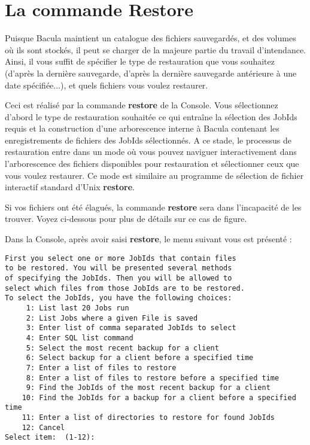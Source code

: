 \label{Example1}
\section{La commande Restore}
Puisque Bacula maintient un catalogue des fichiers sauvegard\'es, et des volumes 
o\`u ils sont stock\'es, il peut se charger de la majeure partie du travail 
d'intendance. Ainsi, il vous suffit de sp\'ecifier le type de restauration que 
vous souhaitez (d'apr\`es la derni\`ere sauvegarde, d'apr\`es la derni\`ere sauvegarde 
ant\'erieure \`a une date sp\'ecifi\'ee...), et quels fichiers vous voulez restaurer. 

Ceci est r\'ealis\'e par la commande {\bf restore} de la Console. Vous s\'electionnez 
d'abord le type de restauration souhait\'ee ce qui entra\^ine la s\'election des 
JobIds requis et la construction d'une arborescence interne \`a Bacula contenant 
les enregistrements de fichiers des JobIds s\'electionn\'es. A ce stade, le 
processus de restauration entre dans un mode o\`u vous pouvez naviguer 
interactivement dans l'arborescence des fichiers disponibles pour restauration 
et s\'electionner ceux que vous voulez restaurer. Ce mode est similaire au 
programme de s\'election de fichier interactif standard d'Unix {\bf restore}.

Si vos fichiers ont \'et\'e \'elagu\'es, la commande {\bf restore} sera dans 
l'incapacit\'e de les trouver. Voyez ci-dessous pour plus de d\'etails sur ce cas 
de figure.

Dans la Console, apr\`es avoir saisi {\bf restore}, le menu suivant vous est 
pr\'esent\'e :

\footnotesize
\begin{verbatim}
First you select one or more JobIds that contain files
to be restored. You will be presented several methods
of specifying the JobIds. Then you will be allowed to
select which files from those JobIds are to be restored.
To select the JobIds, you have the following choices:
     1: List last 20 Jobs run
     2: List Jobs where a given File is saved
     3: Enter list of comma separated JobIds to select
     4: Enter SQL list command
     5: Select the most recent backup for a client
     6: Select backup for a client before a specified time
     7: Enter a list of files to restore
     8: Enter a list of files to restore before a specified time
     9: Find the JobIds of the most recent backup for a client
    10: Find the JobIds for a backup for a client before a specified time
    11: Enter a list of directories to restore for found JobIds
    12: Cancel
Select item:  (1-12):
\end{verbatim}
\normalsize

